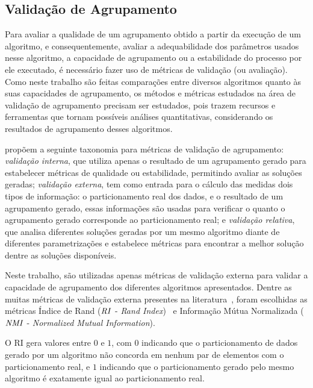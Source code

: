 \documentclass[
    12pt,                %
    oneside,            %
    a4paper,            %
    english,            %
    brazil                %
    ]{abntex2ppgsi}
\begin{document}
\subsection{Validação de Agrupamento}
\label{sec:clustering:eval}

Para avaliar a qualidade de um agrupamento obtido a partir da execução de um algoritmo, e consequentemente, avaliar a adequabilidade dos parâmetros usados nesse algoritmo, a capacidade de agrupamento ou a estabilidade do processo por ele executado, é necessário fazer uso de métricas de validação (ou avaliação).
Como neste trabalho são feitas comparações entre diversos algoritmos quanto às suas capacidades de agrupamento, os métodos e métricas estudados na área de validação de agrupamento precisam ser estudados, pois trazem recursos e ferramentas que tornam possíveis análises quantitativas, considerando os resultados de agrupamento desses algoritmos.

 propõem a seguinte taxonomia para métricas de validação de agrupamento: \textit{validação interna}, que utiliza apenas o resultado de um agrupamento gerado para estabelecer métricas de qualidade ou estabilidade, permitindo avaliar as soluções geradas; \textit{validação externa}, tem como entrada para o cálculo das medidas dois tipos de informação: o particionamento real dos dados, e o resultado de um agrupamento gerado, essas informações são usadas para verificar o quanto o agrupamento gerado corresponde ao particionamento real; e \textit{validação relativa}, que analisa diferentes soluções geradas por um mesmo algoritmo diante de diferentes parametrizações e estabelece métricas para encontrar a melhor solução dentre as soluções disponíveis.

Neste trabalho, são utilizadas apenas métricas de validação externa para validar a capacidade de agrupamento dos diferentes algoritmos apresentados.
Dentre as muitas métricas de validação externa presentes na literatura~\cite{Halkidi2002a,Halkidi2002b}, foram escolhidas as métricas Índice de Rand ($\text{\textit{RI}}$ - \textit{Rand Index})~\cite{Rand1971} e Informação Mútua Normalizada ($\text{\textit{NMI}}$ - \textit{Normalized Mutual Information}).

O RI gera valores entre $0$ e $1$, com $0$ indicando que o particionamento de dados gerado por um algoritmo não concorda em nenhum par de elementos com o particionamento real, e $1$ indicando que o particionamento gerado pelo mesmo algoritmo é exatamente igual ao particionamento real.
\end{document}
